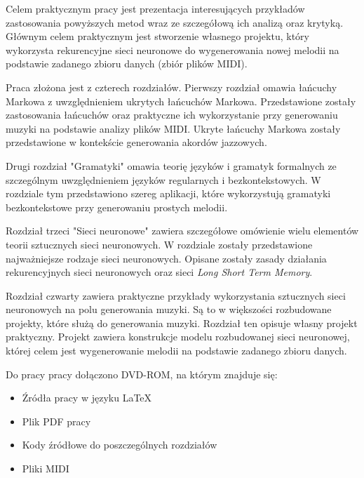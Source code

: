	Celem praktycznym pracy jest prezentacja interesujących przykładów zastosowania powyższych metod wraz ze szczegółową ich analizą oraz krytyką. Głównym celem praktycznym jest stworzenie własnego projektu, który wykorzysta rekurencyjne sieci neuronowe do wygenerowania nowej melodii na podstawie zadanego zbioru danych (zbiór plików MIDI). 
	
	Praca złożona jest z czterech rozdziałów. Pierwszy rozdział omawia łańcuchy Markowa z uwzględnieniem ukrytych łańcuchów Markowa. Przedstawione zostały zastosowania łańcuchów oraz praktyczne ich wykorzystanie przy generowaniu muzyki na podstawie analizy plików MIDI. Ukryte łańcuchy Markowa zostały przedstawione w kontekście generowania akordów jazzowych.
	
	Drugi rozdział "Gramatyki" omawia teorię języków i gramatyk formalnych ze szczególnym uwzględnieniem języków regularnych i bezkontekstowych. W rozdziale tym przedstawiono szereg aplikacji, które wykorzystują gramatyki bezkontekstowe przy generowaniu prostych melodii. 
	
	Rozdział trzeci "Sieci neuronowe" zawiera szczegółowe omówienie wielu elementów teorii sztucznych sieci neuronowych. W rozdziale zostały przedstawione najważniejsze rodzaje sieci neuronowych. Opisane zostały zasady działania rekurencyjnych sieci neuronowych oraz sieci \textit{Long Short Term Memory}. 
	
	
	Rozdział czwarty  zawiera praktyczne przykłady wykorzystania sztucznych sieci neuronowych na polu generowania muzyki. Są to w większości rozbudowane projekty, które służą do generowania muzyki.	Rozdział ten opisuje własny projekt praktyczny. Projekt zawiera konstrukcje modelu rozbudowanej sieci neuronowej, której celem jest wygenerowanie melodii na podstawie zadanego zbioru danych.
	
	Do pracy pracy dołączono DVD-ROM, na którym znajduje się:
	\begin{itemize}
		\item Źródła pracy w języku LaTeX
		\item Plik PDF pracy
		\item Kody źródłowe do poszczególnych rozdziałów
		\item Pliki MIDI
	\end{itemize}